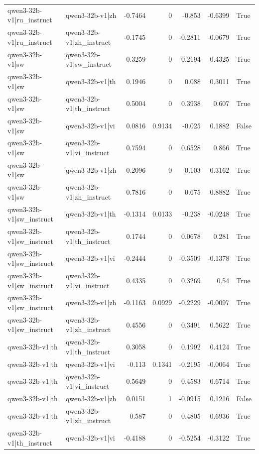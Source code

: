 \begin{table}
\begin{tabular}{l l r r r r l}
qwen3-32b-v1|ru_instruct & qwen3-32b-v1|zh & -0.7464 & 0 & -0.853 & -0.6399 & True \\
qwen3-32b-v1|ru_instruct & qwen3-32b-v1|zh_instruct & -0.1745 & 0 & -0.2811 & -0.0679 & True \\
qwen3-32b-v1|sw & qwen3-32b-v1|sw_instruct & 0.3259 & 0 & 0.2194 & 0.4325 & True \\
qwen3-32b-v1|sw & qwen3-32b-v1|th & 0.1946 & 0 & 0.088 & 0.3011 & True \\
qwen3-32b-v1|sw & qwen3-32b-v1|th_instruct & 0.5004 & 0 & 0.3938 & 0.607 & True \\
qwen3-32b-v1|sw & qwen3-32b-v1|vi & 0.0816 & 0.9134 & -0.025 & 0.1882 & False \\
qwen3-32b-v1|sw & qwen3-32b-v1|vi_instruct & 0.7594 & 0 & 0.6528 & 0.866 & True \\
qwen3-32b-v1|sw & qwen3-32b-v1|zh & 0.2096 & 0 & 0.103 & 0.3162 & True \\
qwen3-32b-v1|sw & qwen3-32b-v1|zh_instruct & 0.7816 & 0 & 0.675 & 0.8882 & True \\
qwen3-32b-v1|sw_instruct & qwen3-32b-v1|th & -0.1314 & 0.0133 & -0.238 & -0.0248 & True \\
qwen3-32b-v1|sw_instruct & qwen3-32b-v1|th_instruct & 0.1744 & 0 & 0.0678 & 0.281 & True \\
qwen3-32b-v1|sw_instruct & qwen3-32b-v1|vi & -0.2444 & 0 & -0.3509 & -0.1378 & True \\
qwen3-32b-v1|sw_instruct & qwen3-32b-v1|vi_instruct & 0.4335 & 0 & 0.3269 & 0.54 & True \\
qwen3-32b-v1|sw_instruct & qwen3-32b-v1|zh & -0.1163 & 0.0929 & -0.2229 & -0.0097 & True \\
qwen3-32b-v1|sw_instruct & qwen3-32b-v1|zh_instruct & 0.4556 & 0 & 0.3491 & 0.5622 & True \\
qwen3-32b-v1|th & qwen3-32b-v1|th_instruct & 0.3058 & 0 & 0.1992 & 0.4124 & True \\
qwen3-32b-v1|th & qwen3-32b-v1|vi & -0.113 & 0.1341 & -0.2195 & -0.0064 & True \\
qwen3-32b-v1|th & qwen3-32b-v1|vi_instruct & 0.5649 & 0 & 0.4583 & 0.6714 & True \\
qwen3-32b-v1|th & qwen3-32b-v1|zh & 0.0151 & 1 & -0.0915 & 0.1216 & False \\
qwen3-32b-v1|th & qwen3-32b-v1|zh_instruct & 0.587 & 0 & 0.4805 & 0.6936 & True \\
qwen3-32b-v1|th_instruct & qwen3-32b-v1|vi & -0.4188 & 0 & -0.5254 & -0.3122 & True \\

\end{tabular}
\end{table}
